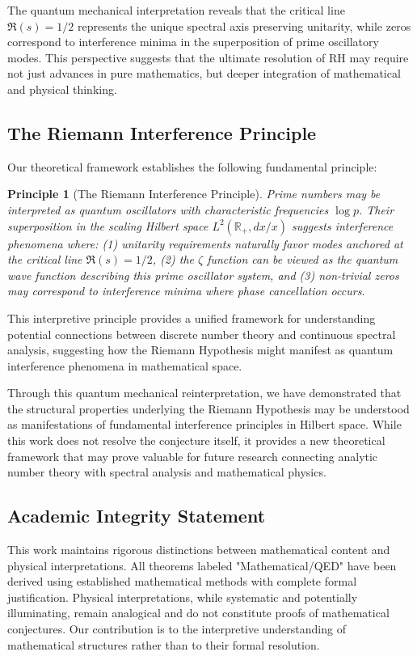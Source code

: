 \documentclass[12pt]{article}
\theoremstyle{plain}
\newtheorem{principle}[theorem]{Principle}
\theoremstyle{definition}
\begin{document}
The quantum mechanical interpretation reveals that the critical line $\Re(s) = 1/2$ represents the unique spectral axis preserving unitarity, while zeros correspond to interference minima in the superposition of prime oscillatory modes. This perspective suggests that the ultimate resolution of RH may require not just advances in pure mathematics, but deeper integration of mathematical and physical thinking.

\subsection{The Riemann Interference Principle}

Our theoretical framework establishes the following fundamental principle:

\begin{principle}[The Riemann Interference Principle]
Prime numbers may be interpreted as quantum oscillators with characteristic frequencies $\log p$. Their superposition in the scaling Hilbert space $L^2(\mathbb{R}_+, dx/x)$ suggests interference phenomena where: (1) unitarity requirements naturally favor modes anchored at the critical line $\Re(s) = 1/2$, (2) the $\zeta$ function can be viewed as the quantum wave function describing this prime oscillator system, and (3) non-trivial zeros may correspond to interference minima where phase cancellation occurs.
\end{principle}

This interpretive principle provides a unified framework for understanding potential connections between discrete number theory and continuous spectral analysis, suggesting how the Riemann Hypothesis might manifest as quantum interference phenomena in mathematical space.

Through this quantum mechanical reinterpretation, we have demonstrated that the structural properties underlying the Riemann Hypothesis may be understood as manifestations of fundamental interference principles in Hilbert space. While this work does not resolve the conjecture itself, it provides a new theoretical framework that may prove valuable for future research connecting analytic number theory with spectral analysis and mathematical physics.

\subsection{Academic Integrity Statement}

This work maintains rigorous distinctions between mathematical content and physical interpretations. All theorems labeled "Mathematical/QED" have been derived using established mathematical methods with complete formal justification. Physical interpretations, while systematic and potentially illuminating, remain analogical and do not constitute proofs of mathematical conjectures. Our contribution is to the interpretive understanding of mathematical structures rather than to their formal resolution.
\end{document}
